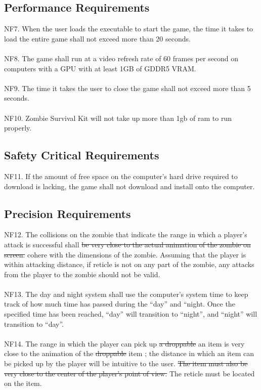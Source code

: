 \documentclass[12pt, titlepage]{article}
\begin{document}
\subsection{Performance Requirements}
{\color{magenta} NF7.} When the user loads the executable to start the game, the time it takes to load the entire game shall not exceed more than 20 seconds.
\\\\
{\color{magenta} NF8.} The game shall run at a video refresh rate of 60 frames per second on computers with a GPU with at least 1GB of GDDR5 VRAM.
\\\\
{\color{magenta} NF9.} The time it takes the user to close the game shall not exceed more than 5 seconds.
\\\\
{\color{magenta} NF10.} Zombie Survival Kit will not take up more than 1gb of ram to run properly.

\subsection{Safety Critical Requirements}
{\color{magenta} NF11.} If the amount of free space on the computer’s hard drive required to download is lacking, the game shall not download and install onto the computer.

\subsection{Precision Requirements}
{\color{magenta} NF12.} The collisions on the zombie that indicate the range in which a player’s attack is successful shall \sout{be very close to the actual animation of the zombie on screen.} {\color{magenta} cohere with the dimensions of the zombie. Assuming that the player is within attacking distance, if reticle is not on any part of the zombie, any attacks from the player to the zombie should not be valid.}
\\\\
{\color{magenta} NF13.} The day and night system shall use the computer’s system time to keep track of how much time has passed during the “day” and “night. Once the specified time has been reached, “day” will transition to “night”, and “night” will transition to “day”.
\\\\
{\color{magenta} NF14.} The range in which the player can pick up \sout{a droppable} {\color{magenta} an} item is very close to the animation of the \sout{droppable} item{\color{magenta} ; the distance in which an item can be picked up by the player will be intuitive to the user}. \sout{The item must also be very close to the center of the player’s point of view.} {\color{magenta} The reticle must be located on the item.}
\end{document}
